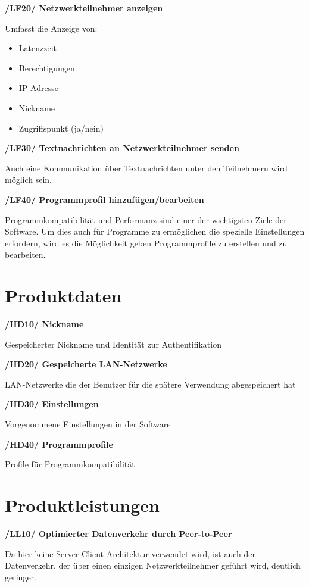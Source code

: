 \documentclass[a4paper,12pt]{scrreprt}
\begin{document}
			\textbf { /LF20/ Netzwerkteilnehmer anzeigen
			}
					
			Umfasst die Anzeige von:
			\begin{itemize}
			
		
			\item Latenzzeit
			\item Berechtigungen
			\item IP-Adresse
			\item Nickname
			\item Zugriffspunkt (ja/nein)\\
				\end{itemize}
			
			\textbf {/LF30/ Textnachrichten an Netzwerkteilnehmer senden}
			
			
			Auch eine Kommunikation über Textnachrichten unter den Teilnehmern wird möglich sein.
			
			 \textbf {/LF40/ Programmprofil hinzufügen/bearbeiten}
			
			Programmkompatibilität und Performanz sind einer der wichtigsten Ziele der Software. Um dies auch für Programme zu ermöglichen die spezielle Einstellungen erfordern, wird es die Möglichkeit geben Programmprofile zu erstellen und zu bearbeiten.
			
\chapter{Produktdaten}
	
	\textbf{/HD10/ Nickname}	
	
	Gespeicherter Nickname und Identität zur Authentifikation
	
	\textbf{/HD20/ Gespeicherte LAN-Netzwerke}
	
	LAN-Netzwerke die der Benutzer für die spätere Verwendung abgespeichert hat
	
	\textbf{/HD30/ Einstellungen}
	
	Vorgenommene Einstellungen in der Software
	
	\textbf{/HD40/ Programmprofile}
	
	Profile für Programmkompatibilität

\chapter{Produktleistungen}
\textbf{/LL10/ Optimierter Datenverkehr durch Peer-to-Peer}
	
	Da hier keine Server-Client Architektur verwendet wird, ist auch der Datenverkehr, der über einen einzigen Netzwerkteilnehmer geführt wird, deutlich geringer.
	
\end{document}
